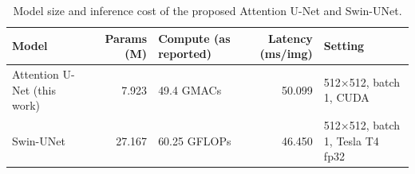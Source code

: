 \begin{table}
\caption{Model size and inference cost of the proposed Attention U-Net and Swin-UNet.}
\label{tab:complexity_att_vs_swin}
\begin{tabular}{lrlrl}
\toprule
Model & Params (M) & Compute (as reported) & Latency (ms/img) & Setting \\
\midrule
Attention U-Net (this work) & 7.923 & 49.4 GMACs & 50.099 & 512×512, batch 1, CUDA \\
Swin-UNet & 27.167 & 60.25 GFLOPs & 46.450 & 512×512, batch 1, Tesla T4 fp32 \\
\bottomrule
\end{tabular}
\end{table}
